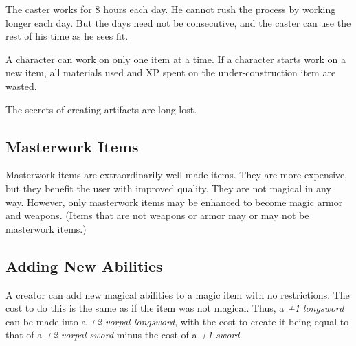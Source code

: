 The caster works for 8 hours each day. He cannot rush the process by working longer each day. But the days need not be consecutive, and the caster can use the rest of his time as he sees fit.

A character can work on only one item at a time. If a character starts work on a new item, all materials used and XP spent on the under-construction item are wasted.

The secrets of creating artifacts are long lost.




\subsection{Masterwork Items}
Masterwork items are extraordinarily well-made items. They are more expensive, but they benefit the user with improved quality. They are not magical in any way. However, only masterwork items may be enhanced to become magic armor and weapons. (Items that are not weapons or armor may or may not be masterwork items.)













\subsection{Adding New Abilities}
A creator can add new magical abilities to a magic item with no restrictions. The cost to do this is the same as if the item was not magical. Thus, a \emph{+1 longsword} can be made into a \emph{+2 vorpal longsword}, with the cost to create it being equal to that of a \emph{+2 vorpal sword} minus the cost of a \emph{+1 sword}.

